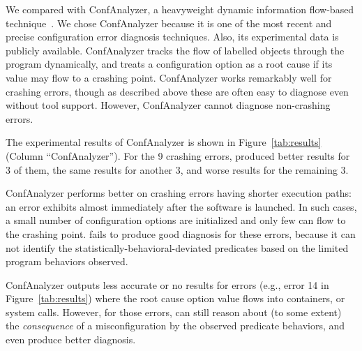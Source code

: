 We compared \ourtool with ConfAnalyzer, a heavyweight dynamic information
flow-based technique~\cite{Rabkin:2011:PPC}.
We chose ConfAnalyzer because it is one of the most recent and precise configuration
error diagnosis techniques. Also, its 
experimental data is publicly available.
ConfAnalyzer tracks the flow of labelled objects through the
program dynamically,
and treats a configuration option as a root cause if its
value may flow to a crashing point.
ConfAnalyzer works remarkably well for crashing errors, though as
described above these are often easy to diagnose even without tool
support. However, ConfAnalyzer cannot diagnose non-crashing errors.

The experimental results of ConfAnalyzer is shown in Figure~\ref{tab:results} (Column ``ConfAnalyzer'').
For the 9 crashing errors, \ourtool produced better results for 3 of them,
the same results for another 3, and worse results for the remaining 3.

ConfAnalyzer performs better on crashing errors
having shorter execution paths: an error exhibits
almost immediately after the software is launched.
In such cases, a small number of configuration options are initialized and
only few can flow to the crashing point. 
\ourtool fails to produce good diagnosis for these errors, because it can not identify
 the statistically-behavioral-deviated predicates based on the limited
program behaviors observed.

ConfAnalyzer outputs less accurate or no results
for errors (e.g., error 14 in Figure~\ref{tab:results}) where the root cause option value
flows into containers, or system calls. However, for those errors,
\ourtool can still reason about (to some extent) the \textit{consequence} of a misconfiguration
by the observed predicate behaviors, and even produce better diagnosis.






